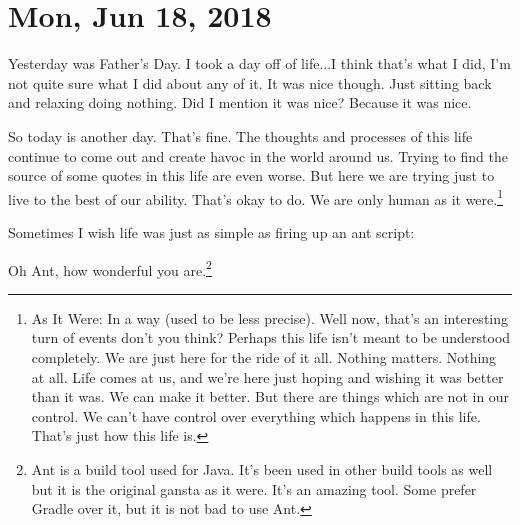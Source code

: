 \section{Mon, Jun 18, 2018}

Yesterday was Father's Day. I took a day off of life...I think that's what I
did, I'm not quite sure what I did about any of it. It was nice though. Just
sitting back and relaxing doing nothing. Did I mention it was nice? Because it
was nice.

So today is another day. That's fine. The thoughts and processes of this life
continue to come out and create havoc in the world around us. Trying to find the
source of some quotes in this life are even worse. But here we are trying just
to live to the best of our ability. That's okay to do. We are only human as it
were.\footnote{As It Were: In a way (used to be less precise). Well now, that's 
an interesting turn of events don't you think? Perhaps this life isn't meant to
be understood completely. We are just here for the ride of it all. Nothing
matters. Nothing at all. Life comes at us, and we're here just hoping and
wishing it was better than it was. We can make it better. But there are
things which are not in our control. We can't have control over everything which
happens in this life. That's just how this life is.}

Sometimes I wish life was just as simple as firing up an ant script:



Oh Ant, how wonderful you are.\footnote{
Ant is a build tool used for Java. It's been used in other build tools as well
but it is the original gansta as it were. It's an amazing tool. Some prefer
Gradle over it, but it is not bad to use Ant.
}